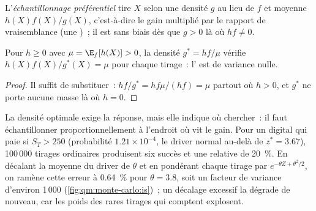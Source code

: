 \begin{definition}\label{def:qm:monte-carlo:is}
L'\emph{échantillonnage préférentiel} tire $X$ selon une densité $g$ au lieu de $f$ et moyenne $h(X)f(X)/g(X)$, c'est-à-dire le gain multiplié par le rapport de vraisemblance (une )~;
il est sans biais dès que $g > 0$ là où $hf \ne 0$.
\end{definition}

\begin{proposition}\label{prop:qm:monte-carlo:zero}
Pour $h \ge 0$ avec $\mu = \E_f[h(X)] > 0$, la densité $g^* = hf/\mu$ vérifie $h(X)f(X)/g^*(X) = \mu$ pour chaque tirage~: l' est de variance nulle.
\end{proposition}

\begin{proof}
Il suffit de substituer~: $hf/g^* = hf\mu/(hf) = \mu$ partout où $h > 0$, et $g^*$ ne porte aucune masse là où $h = 0$.
\end{proof}

La densité optimale exige la réponse, mais elle indique où chercher~: il faut échantillonner proportionnellement à l'endroit où vit le gain. Pour un digital qui paie si $S_T > 250$ (probabilité $1.21 \times 10^{-4}$, le
driver normal au-delà de $z^* = 3.67$), 100\,000 tirages ordinaires produisent six succès et une  relative de 20~\%. En décalant la moyenne du driver de $\theta$ et en pondérant chaque tirage par $e^{-\theta Z +
\theta^2/2}$, on ramène cette erreur à 0.64~\% pour $\theta = 3.8$, soit un facteur de variance d'environ 1\,000 (\cref{fig:qm:monte-carlo:is})~; un décalage excessif la dégrade de nouveau, car les poids des rares tirages qui
comptent explosent.

\begin{omfigure}

\label{fig:qm:monte-carlo:is}
\end{omfigure}

